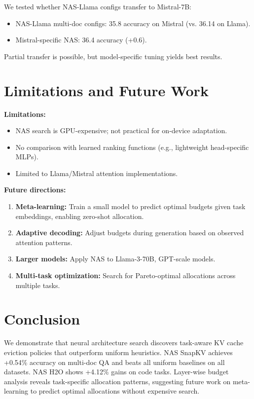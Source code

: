 \documentclass[11pt]{article}
\begin{document}
We tested whether NAS-Llama configs transfer to Mistral-7B:
\begin{itemize}
    \item NAS-Llama multi-doc configs: 35.8 accuracy on Mistral (vs. 36.14 on Llama).
    \item Mistral-specific NAS: 36.4 accuracy (+0.6).
\end{itemize}

Partial transfer is possible, but model-specific tuning yields best results.

\section{Limitations and Future Work}

\textbf{Limitations:}
\begin{itemize}
    \item NAS search is GPU-expensive; not practical for on-device adaptation.
    \item No comparison with learned ranking functions (e.g., lightweight head-specific MLPs).
    \item Limited to Llama/Mistral attention implementations.
\end{itemize}

\textbf{Future directions:}
\begin{enumerate}
    \item \textbf{Meta-learning:} Train a small model to predict optimal budgets given task embeddings, enabling zero-shot allocation.
    \item \textbf{Adaptive decoding:} Adjust budgets during generation based on observed attention patterns.
    \item \textbf{Larger models:} Apply NAS to Llama-3-70B, GPT-scale models.
    \item \textbf{Multi-task optimization:} Search for Pareto-optimal allocations across multiple tasks.
\end{enumerate}

\section{Conclusion}

We demonstrate that neural architecture search discovers task-aware KV cache eviction policies that outperform uniform heuristics. NAS SnapKV achieves +0.54\% accuracy on multi-doc QA and beats all uniform baselines on all datasets. NAS H2O shows +4.12\% gains on code tasks. Layer-wise budget analysis reveals task-specific allocation patterns, suggesting future work on meta-learning to predict optimal allocations without expensive search.
\end{document}
